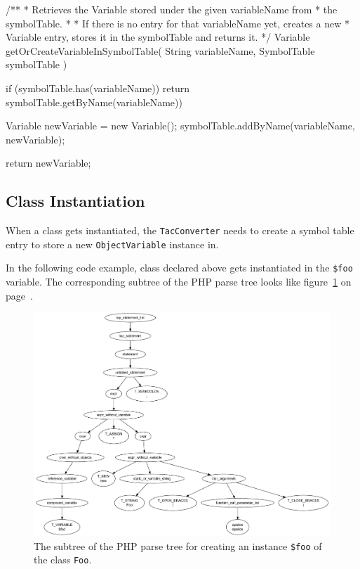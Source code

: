 \begin{textcode}
/**
 * Retrieves the Variable stored under the given variableName from
 * the symbolTable.
 *
 * If there is no entry for that variableName yet, creates a new
 * Variable entry, stores it in the symbolTable and returns it.
 */
Variable getOrCreateVariableInSymbolTable(
  String variableName, SymbolTable symbolTable
) {
  if (symbolTable.has(variableName)) {
    return symbolTable.getByName(variableName))
  }

  Variable newVariable = new Variable();
  symbolTable.addByName(variableName, newVariable);

  return newVariable;
}
\end{textcode}


\subsection{Class Instantiation}

When a class gets instantiated, the \texttt{TacConverter} needs to create a symbol table entry to store a new \texttt{ObjectVariable} instance in.

In the following code example, class declared above gets instantiated in the \texttt{\$foo} variable. The corresponding subtree of the PHP parse tree looks like figure~\ref{fig:parse-tree-new-foo} on page~\pageref{fig:parse-tree-new-foo}.


\begin{figure}[htb]
  \begin{center}
    \includegraphics[scale=0.5]{images/parsetree-new-foo}
   \caption{The subtree of the PHP parse tree for creating an instance \texttt{\$foo} of the class \texttt{Foo}.}
   \label{fig:parse-tree-new-foo}
  \end{center}
\end{figure}

